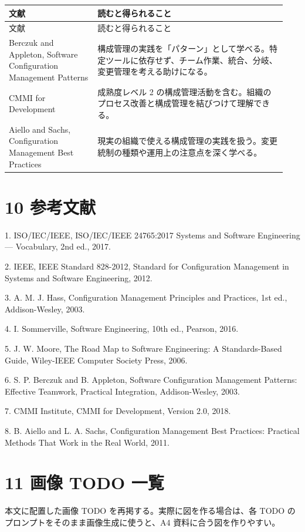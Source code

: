 \documentclass[uplatex,a4paper,11pt]{jsarticle}
\begin{document}
\begin{longtable}{p{0.30\linewidth}p{0.64\linewidth}}\toprule
文献 & 読むと得られること \\ \midrule
\endfirsthead\toprule
文献 & 読むと得られること \\ \midrule
\endhead
Berczuk and Appleton, Software Configuration Management Patterns & 構成管理の実践を「パターン」として学べる。特定ツールに依存せず、チーム作業、統合、分岐、変更管理を考える助けになる。 \\
CMMI for Development & 成熟度レベル 2 の構成管理活動を含む。組織のプロセス改善と構成管理を結びつけて理解できる。 \\
Aiello and Sachs, Configuration Management Best Practices & 現実の組織で使える構成管理の実践を扱う。変更統制の種類や運用上の注意点を深く学べる。 \\
\bottomrule\end{longtable}
\section*{10 参考文献}
1. ISO/IEC/IEEE, ISO/IEC/IEEE 24765:2017 Systems and Software Engineering — Vocabulary, 2nd ed., 2017.

2. IEEE, IEEE Standard 828-2012, Standard for Configuration Management in Systems and Software Engineering, 2012.

3. A. M. J. Hass, Configuration Management Principles and Practices, 1st ed., Addison-Wesley, 2003.

4. I. Sommerville, Software Engineering, 10th ed., Pearson, 2016.

5. J. W. Moore, The Road Map to Software Engineering: A Standards-Based Guide, Wiley-IEEE Computer Society Press, 2006.

6. S. P. Berczuk and B. Appleton, Software Configuration Management Patterns: Effective Teamwork, Practical Integration, Addison-Wesley, 2003.

7. CMMI Institute, CMMI for Development, Version 2.0, 2018.

8. B. Aiello and L. A. Sachs, Configuration Management Best Practices: Practical Methods That Work in the Real World, 2011.

\section*{11 画像 TODO 一覧}
本文に配置した画像 TODO を再掲する。実際に図を作る場合は、各 TODO のプロンプトをそのまま画像生成に使うと、A4 資料に合う図を作りやすい。
\end{document}
